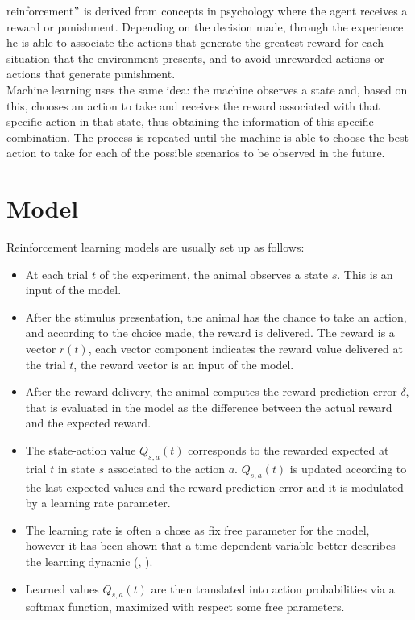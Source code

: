 reinforcement$"$ is derived from concepts in psychology where the agent receives a reward or punishment. Depending on the decision made, through the experience he is able to associate the actions that generate the greatest reward for each situation that the environment presents, and to avoid unrewarded actions or actions that generate punishment.\\Machine learning uses the same idea: the machine observes a state and, based on this, chooses an action to take and receives the reward associated with that specific action in that state, thus obtaining the information of this specific combination. The process is repeated until the machine is able to choose the best action to take for each of the possible scenarios to be observed in the future.\\
\section{Model}
\label{sec:Model}
Reinforcement learning models are usually set up as follows:
\begin{itemize}
    \item At each trial $t$ of the experiment, the animal observes a state $s$. This is an input of the model.
    \item After the stimulus presentation, the animal has the chance to take an action, and according to the choice made, the reward is delivered. The reward is a vector $r(t)$, each vector component indicates the reward value delivered at the trial $t$, the reward vector is an input of the model.
    \item After the reward delivery, the animal computes the reward prediction error $\delta$, that is evaluated in the model as the difference between the actual reward and the expected reward.
    \item The state-action value $Q_{s,a}(t)$ corresponds to the rewarded expected at trial $t$ in state $s$ associated to the action $a$. $Q_{s,a}(t)$ is updated according to the last expected values and the reward prediction error and it is modulated by a learning rate parameter.
    \item The learning rate is often a chose as fix free parameter for the model, however it has been shown that a time dependent variable better describes the learning dynamic (\cite{Funamizu}, \cite{Daw}).
    \item Learned values $Q_{s,a}(t)$ are then translated into action probabilities via a softmax function, maximized with respect some free parameters.
\end{itemize}
